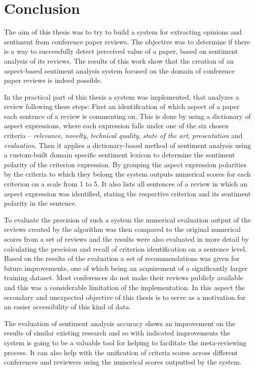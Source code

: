 \chapter*{Conclusion}
The aim of this thesis was to try to build a system for extracting opinions and sentiment from conference paper reviews. The objective was to determine if there is a way to successfully detect perceived value of a paper, based on sentiment analysis of its reviews.
The results of this work show that the creation of an aspect-based sentiment analysis system focused on the domain of conference paper reviews is indeed possible. 

In the practical part of this thesis a system was implemented, that analyzes a review following these steps: First an identification of which aspect of a paper each sentence of a review is commenting on. This is done by using a dictionary of aspect expressions, where each expression falls under one of the six chosen criteria -- \textit{relevance}, \textit{novelty}, \textit{technical quality}, \textit{state of the art}, \textit{presentation} and \textit{evaluation}. Then it applies a dictionary-based method of sentiment analysis using a custom-built domain specific sentiment lexicon to determine the sentiment polarity of the criterion expression. By grouping the aspect expression polarities by the criteria to which they belong the system outputs numerical scores for each criterion on a scale from 1 to 5. It also lists all sentences of a review in which an aspect expression was identified, stating the respective criterion and its sentiment polarity in the sentence.

To evaluate the precision of such a system the numerical evaluation output of the reviews created by the algorithm was then compared to the original numerical scores from a set of reviews and the results were also evaluated in more detail by calculating the precision and recall of criterion identification on a sentence level. Based on the results of the evaluation a set of recommendations was given for future improvements, one of which being an acquirement of a significantly larger training dataset. Most conferences do not make their reviews publicly available and this was a considerable limitation of the implementation. In this aspect the secondary and unexpected objective of this thesis is to serve as a motivation for an easier accessibility of this kind of data. 

The evaluation of sentiment analysis accuracy shows an improvement on the results of similar existing research and so with indicated improvements the system is going to be a valuable tool for helping to facilitate the meta-reviewing process. It can also help with the unification of criteria scores across different conferences and reviewers using the numerical scores outputted by the system.

